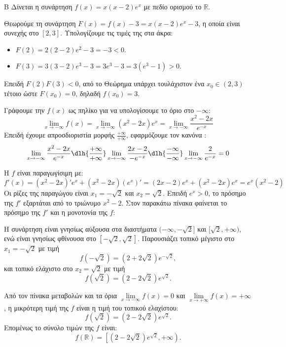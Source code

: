 \begin{thema}{Β}
Δίνεται η συνάρτηση $f(x) = x(x-2)e^x$ με πεδίο ορισμού το $\mathbb{R}$.
\begin{erwthma}
\item Θεωρούμε τη συνάρτηση $F(x) = f(x)-3 = x(x-2)e^x-3$, η οποία είναι συνεχής στο $[2,3]$.
Υπολογίζουμε τις τιμές της στα άκρα:
\begin{itemize}
\item $F(2)=2(2-2)e^2-3=-3<0$.
\item $F(3)=3(3-2)e^3-3=3e^3-3=3(e^3-1)>0$.
\end{itemize}
Επειδή $F(2)F(3)<0$, από το Θεώρημα  υπάρχει τουλάχιστον ένα $x_0\in(2,3)$ τέτοιο ώστε $F(x_0)=0$, δηλαδή $f(x_0)=3$.

\item Γράφουμε την $f(x)$ ως πηλίκο για να υπολογίσουμε το όριο στο $-\infty$:
\[ \lim_{x\to-\infty} f(x) = \lim_{x\to-\infty} (x^2-2x)e^x = \lim_{x\to-\infty} \frac{x^2-2x}{e^{-x}} \]
Επειδή έχουμε απροσδιοριστία μορφής $\frac{+\infty}{+\infty}$, εφαρμόζουμε τον κανόνα :
\[ \lim_{x\to-\infty} \frac{x^2-2x}{e^{-x}} \dlh{\frac{+\infty}{+\infty}} \lim_{x\to-\infty} \frac{2x-2}{-e^{-x}} \dlh{\frac{-\infty}{-\infty}} \lim_{x\to-\infty} \frac{2}{e^{-x}} = 0 \]

\item Η $f$ είναι παραγωγίσιμη με:
\[ f'(x) = (x^2-2x)'e^x + (x^2-2x)(e^x)' = (2x-2)e^x + (x^2-2x)e^x = e^x(x^2-2) \]
Οι ρίζες της παραγώγου είναι $x_1=-\sqrt{2}$ και $x_2=\sqrt{2}$.
Επειδή $e^x > 0$, το πρόσημο της $f'$ εξαρτάται από το τριώνυμο $x^2-2$.
Στον παρακάτω πίνακα φαίνεται το πρόσημο της $f'$ και η μονοτονία της $f$:
\begin{center}
\end{center}
Η συνάρτηση είναι γνησίως αύξουσα στα διαστήματα $(-\infty, -\sqrt{2}]$ και $[\sqrt{2}, +\infty)$, ενώ είναι γνησίως φθίνουσα στο $[-\sqrt{2}, \sqrt{2}]$.
Παρουσιάζει τοπικό μέγιστο στο $x_1 = -\sqrt{2}$ με τιμή
\[ f(-\sqrt{2}) = (2+2\sqrt{2})e^{-\sqrt{2}}, \]
και τοπικό ελάχιστο στο $x_2 = \sqrt{2}$ με τιμή
\[ f(\sqrt{2}) = (2-2\sqrt{2})e^{\sqrt{2}}. \]

\item Από τον πίνακα μεταβολών και τα όρια $\lim\limits_{x\to-\infty} f(x)=0$ και $\lim\limits_{x\to+\infty} f(x)=+\infty$, η μικρότερη τιμή της $f$ είναι η τιμή του τοπικού ελαχίστου:
\[ f(\sqrt{2}) = (2-2\sqrt{2})e^{\sqrt{2}}. \]
Επομένως το σύνολο τιμών της $f$ είναι:
\[ f(\mathbb{R}) = \left[(2-2\sqrt{2})e^{\sqrt{2}}, +\infty\right). \]
\end{erwthma}
\end{thema}
